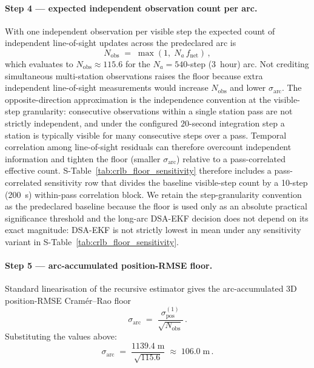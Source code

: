 \documentclass{article}
\begin{document}
\paragraph{Step 4 --- expected independent observation count per arc.}
With one independent observation per visible step the expected count of independent line-of-sight updates across the predeclared arc is
\begin{equation}
N_{\mathrm{obs}} \;=\; \max(1,\;N_a\,f_{\mathrm{net}})\,,
\label{eq:crlb-nobs}
\end{equation}
which evaluates to $N_{\mathrm{obs}}\approx 115.6$ for the $N_a=540$-step (3~hour) arc. Not crediting simultaneous multi-station observations raises the floor because extra independent line-of-sight measurements would increase $N_{\mathrm{obs}}$ and lower $\sigma_{\mathrm{arc}}$. The opposite-direction approximation is the independence convention at the visible-step granularity: consecutive observations within a single station pass are not strictly independent, and under the configured $20$-second integration step a station is typically visible for many consecutive steps over a pass. Temporal correlation among line-of-sight residuals can therefore overcount independent information and tighten the floor (smaller $\sigma_{\mathrm{arc}}$) relative to a pass-correlated effective count. S-Table~\ref{tab:crlb_floor_sensitivity} therefore includes a pass-correlated sensitivity row that divides the baseline visible-step count by a 10-step (200~s) within-pass correlation block. We retain the step-granularity convention as the predeclared baseline because the floor is used only as an absolute practical significance threshold and the long-arc DSA-EKF decision does not depend on its exact magnitude: DSA-EKF is not strictly lowest in mean under any sensitivity variant in S-Table~\ref{tab:crlb_floor_sensitivity}.

\paragraph{Step 5 --- arc-accumulated position-RMSE floor.}
Standard linearisation of the recursive estimator \cite[Sec.~4.4]{tapley2004statistical} gives the arc-accumulated 3D position-RMSE Cram\'er--Rao floor
\begin{equation}
\sigma_{\mathrm{arc}} \;=\; \frac{\sigma^{(1)}_{\mathrm{pos}}}{\sqrt{N_{\mathrm{obs}}}}\,.
\label{eq:crlb-step5}
\end{equation}
Substituting the values above:
\begin{equation*}
\sigma_{\mathrm{arc}} \;=\; \frac{1139.4\;\mathrm{m}}{\sqrt{115.6}} \;\approx\; 106.0\;\mathrm{m}\,.
\end{equation*}
\end{document}

